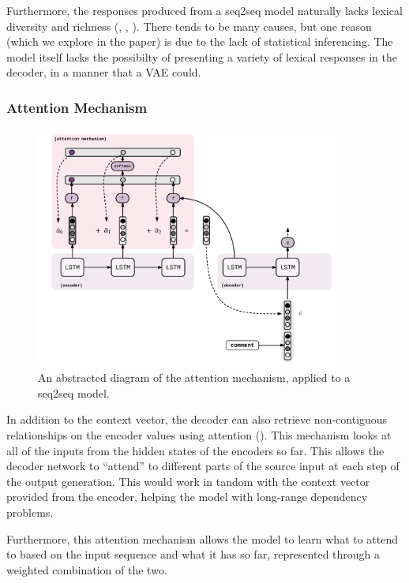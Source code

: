 \documentclass[12pt,twoside]{report}
\begin{document}
Furthermore, the responses produced from a seq2seq model naturally lacks lexical diversity and richness (\cite{serban_hierarchical_2016}, \cite{zhao_learning_2017}, \cite{jiang_why_2018}). There tends to be many causes, but one reason (which we explore in the paper) is due to the lack of statistical inferencing. The model itself lacks the possibilty of presenting a variety of lexical responses in the decoder, in a manner that a VAE could.

\subsubsection{Attention Mechanism}

\begin{figure}[!ht]
      
	\centering
	\includegraphics[width=100mm]{diagrams/seq2seq_attention_mechanism.pdf}
	\caption{An abstracted diagram of the attention mechanism, applied to a seq2seq model.\label{seq2seq_attn}}
\end{figure}

In addition to the context vector, the decoder can also retrieve non-contiguous relationships on the encoder values using attention (\cite{bahdanau_neural_2014}). This mechanism looks at all of the inputs from the hidden states of the encoders so far. This allows the decoder network to ``attend'' to different parts of the source input at each step of the output generation. This would work in tandom with the context vector provided from the encoder, helping the model with long-range dependency problems.

Furthermore, this attention mechanism allows the model to learn what to attend to based on the input sequence and what it has so far, represented through a weighted combination of the two.
\end{document}
